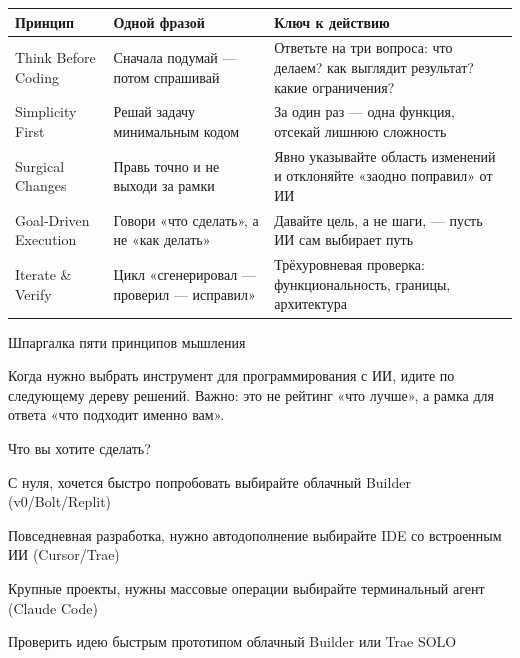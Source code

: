 


\begin{center}
\begin{tabularx}{\linewidth}{|X|X|X|}
\hline
\textbf{Принцип} & \textbf{Одной фразой} & \textbf{Ключ к действию} \tabularnewline
\hline
Think Before Coding & Сначала подумай — потом спрашивай & Ответьте на три вопроса: что делаем? как выглядит результат? какие ограничения? \tabularnewline
Simplicity First & Решай задачу минимальным кодом & За один раз — одна функция, отсекай лишнюю сложность \tabularnewline
Surgical Changes & Правь точно и не выходи за рамки & Явно указывайте область изменений и отклоняйте «заодно поправил» от ИИ \tabularnewline
Goal-Driven Execution & Говори «что сделать», а не «как делать» & Давайте цель, а не шаги, — пусть ИИ сам выбирает путь \tabularnewline
Iterate \& Verify & Цикл «сгенерировал — проверил — исправил» & Трёхуровневая проверка: функциональность, границы, архитектура \tabularnewline
\hline
\end{tabularx}
\end{center}

\begin{center}\small\color{gray}Шпаргалка пяти принципов мышления\end{center}


Когда нужно выбрать инструмент для программирования с ИИ, идите по следующему дереву решений. Важно: это не рейтинг «что лучше», а рамка для ответа «что подходит именно вам».

Что вы хотите сделать?

С нуля, хочется быстро попробовать выбирайте облачный Builder (v0/Bolt/Replit)

Повседневная разработка, нужно автодополнение выбирайте IDE со встроенным ИИ (Cursor/Trae)

Крупные проекты, нужны массовые операции выбирайте терминальный агент (Claude Code)

Проверить идею быстрым прототипом облачный Builder или Trae SOLO

